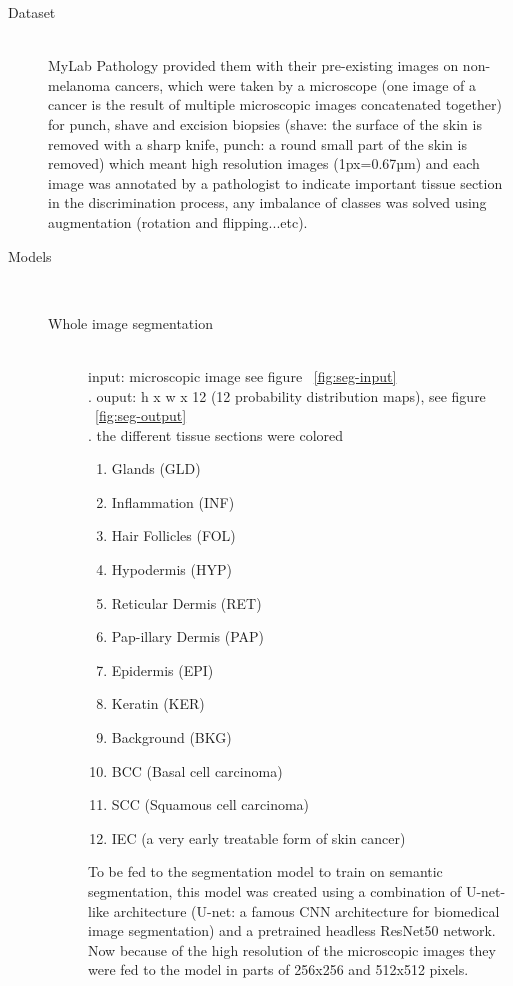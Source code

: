 \begin{description}
\item[Dataset] \hfill \\
    MyLab Pathology provided them with their pre-existing images on non-melanoma cancers, which were taken by a microscope (one image of a cancer is the result of multiple microscopic images concatenated together) for punch, shave and excision biopsies (shave: the surface of the skin is removed with a sharp knife, punch: a round small part of the skin is removed) which meant high resolution images (1px=0.67µm) and each image was annotated by a pathologist to indicate important tissue section in the discrimination process, any imbalance of classes was solved using augmentation (rotation and flipping...etc).

\item[Models] \hfill \\
    \begin{description}
    \item[Whole image segmentation] \hfill \\
        input: microscopic image  see figure ~\ref{fig:seg-input} \hfill \\.
        ouput: h x w x 12 (12 probability distribution maps), see figure ~\ref{fig:seg-output}  \hfill \\.
        the different tissue sections were colored 
        \begin{enumerate}
            \item Glands (GLD) 
            \item Inflammation (INF) 
            \item Hair Follicles (FOL) 
            \item Hypodermis (HYP) 
            \item Reticular Dermis (RET) 
            \item Pap-illary Dermis (PAP) 
            \item Epidermis (EPI) 
            \item Keratin (KER) 
            \item Background (BKG) 
            \item BCC (Basal cell carcinoma)
            \item SCC (Squamous cell carcinoma)
            \item IEC (a very early treatable form of skin cancer)
        \end{enumerate}
        To be fed to the segmentation model to train on semantic segmentation, this model was created using a combination of U-net-like architecture (U-net: a famous CNN architecture for biomedical image segmentation) and a pretrained headless ResNet50 network. Now because of the high resolution of the microscopic images they were fed to the model in parts of 256x256 and 512x512 pixels.


\end{description}
\end{description}
